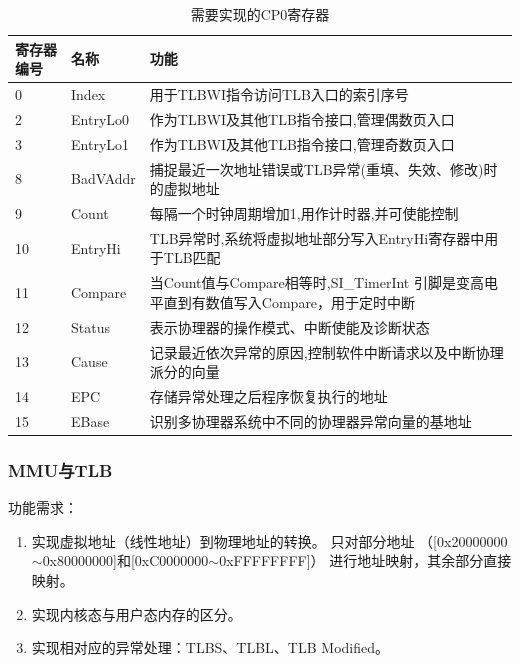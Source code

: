             \begin{table}
            \centering
            \caption{需要实现的CP0寄存器}\label{table_cp0_reg}
            \begin{tabularx}{\textwidth}{|l|l|X|}
            \hline
            寄存器编号 & 名称 & 功能 \\
            \hline
            0 & Index & 用于TLBWI指令访问TLB入口的索引序号 \\
            \hline
            2 & EntryLo0 & 作为TLBWI及其他TLB指令接口,管理偶数页入口 \\
            \hline
            3 & EntryLo1 & 作为TLBWI及其他TLB指令接口,管理奇数页入口 \\
            \hline
            8 & BadVAddr & 捕捉最近一次地址错误或TLB异常(重填、失效、修改)时的虚拟地址 \\
            \hline
            9 & Count & 每隔一个时钟周期增加1,用作计时器,并可使能控制 \\
            \hline
            10 & EntryHi & TLB异常时,系统将虚拟地址部分写入EntryHi寄存器中用于TLB匹配 \\
            \hline
            11 & Compare & 当Count值与Compare相等时,SI\_TimerInt 引脚是变高电平直到有数值写入Compare，用于定时中断 \\
            \hline
            12 & Status & 表示协理器的操作模式、中断使能及诊断状态 \\
            \hline
            13 & Cause & 记录最近依次异常的原因,控制软件中断请求以及中断协理派分的向量 \\
            \hline
            14 & EPC & 存储异常处理之后程序恢复执行的地址 \\
            \hline
            15 & EBase & 识别多协理器系统中不同的协理器异常向量的基地址 \\
            \hline
            \end{tabularx}
            \end{table}

        \subsubsection{MMU与TLB}
            功能需求：
            \begin{enumerate}
            \item
                实现虚拟地址（线性地址）到物理地址的转换。%
                只对部分地址%
                （[0x20000000$\sim$0x80000000]和[0xC0000000$\sim$0xFFFFFFFF]）%
                进行地址映射，其余部分直接映射。
            \item
                实现内核态与用户态内存的区分。
            \item
                实现相对应的异常处理：TLBS、TLBL、TLB Modified。
            \end{enumerate}

